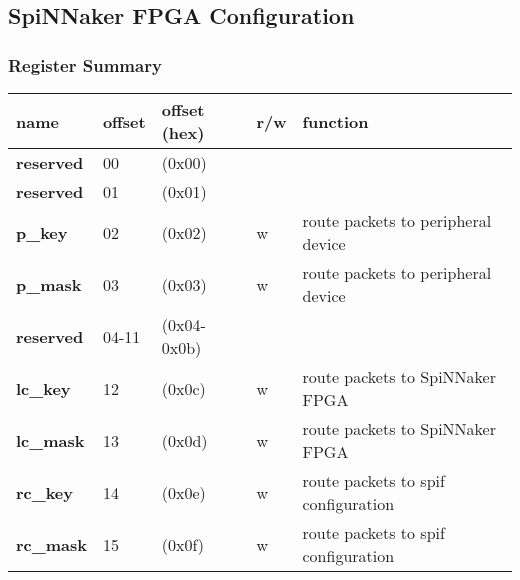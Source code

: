 \documentclass[11pt,a4paper,twoside]{article}
\begin{document}
\clearpage
\subsection{SpiNNaker FPGA Configuration}


\subsubsection*{Register Summary}


\begin{center}
\begin{table}[!h]
	\begin{tabularx}{\textwidth}{| p{34mm} p{13mm} p{21mm} p{7mm} X |}
		\hline
		\textbf{name}                        & \textbf{offset}           & \textbf{offset} (hex)           & \textbf{r/w}        & \textbf{function} \\%
		\hline
		\hline
		\cellcolor{gray!25}\textbf{reserved} & \cellcolor{gray!25}00     & \cellcolor{gray!25}(0x00)       & \cellcolor{gray!25} & \cellcolor{gray!25}\\%
		\cellcolor{gray!25}\textbf{reserved} & \cellcolor{gray!25}01     & \cellcolor{gray!25}(0x01)       & \cellcolor{gray!25} & \cellcolor{gray!25}\\%
		\textbf{p\_key}                      & 02                        & (0x02)                          & w                   & route packets to peripheral device             \\%
		\textbf{p\_mask}                     & 03                        & (0x03)                          & w                   & route packets to peripheral device             \\%
		\cellcolor{gray!25}\textbf{reserved} & \cellcolor{gray!25}04-11  & \cellcolor{gray!25} (0x04-0x0b) & \cellcolor{gray!25} & \cellcolor{gray!25}\\%
		\textbf{lc\_key}                     & 12                        & (0x0c)                          & w                   & route packets to SpiNNaker FPGA  \\%
		\textbf{lc\_mask}                    & 13                        & (0x0d)                          & w                   & route packets to SpiNNaker FPGA  \\%
		\textbf{rc\_key}                     & 14                        & (0x0e)                          & w                   & route packets to spif configuration   \\%
		\textbf{rc\_mask}                    & 15                        & (0x0f)                          & w                   & route packets to spif configuration   \\%

\end{tabularx}
\end{table}
\end{center}
\end{document}
